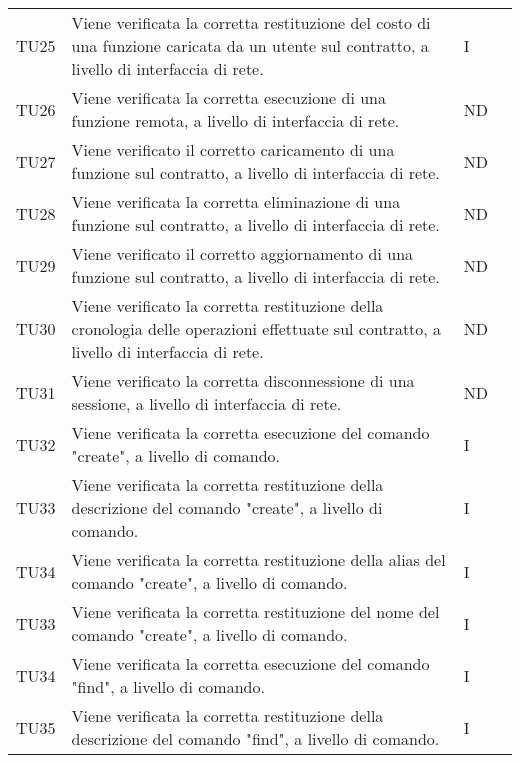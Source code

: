 \begin{longtable}{|C{1.5cm}|C{8cm}|C{3cm}|C{1cm}|}
	TU25 &
	Viene verificata la corretta restituzione del costo di una funzione caricata da un utente sul contratto, a livello di interfaccia di rete.  &
	I \\

	TU26 &
	Viene verificata la corretta esecuzione di una funzione remota, a livello di interfaccia di rete.  &
	ND \\

	TU27 &
	Viene verificato il corretto caricamento di una funzione sul contratto, a livello di interfaccia di rete.  &
	ND \\

	TU28 &
	Viene verificata la corretta eliminazione di una funzione sul contratto, a livello di interfaccia di rete.  &
	ND \\

	TU29 &
	Viene verificato il corretto aggiornamento di una funzione sul contratto, a livello di interfaccia di rete.  &
	ND \\

	TU30 &
	Viene verificato la corretta restituzione della cronologia delle operazioni effettuate sul contratto, a livello di interfaccia di rete.  &
	ND \\

	TU31 &
	Viene verificato la corretta disconnessione di una sessione, a livello di interfaccia di rete.  &
	ND \\

	TU32 &
	Viene verificata la corretta esecuzione del comando "create", a livello di comando.  &
	I \\

	TU33 &
	Viene verificata la corretta restituzione della descrizione del comando "create", a livello di comando.  &
	I \\

	TU34 &
	Viene verificata la corretta restituzione della alias del comando "create", a livello di comando.  &
	I \\

	TU33 &
	Viene verificata la corretta restituzione del nome del comando "create", a livello di comando.  &
	I \\

	TU34 &
	Viene verificata la corretta esecuzione del comando "find", a livello di comando.  &
	I \\

	TU35 &
	Viene verificata la corretta restituzione della descrizione del comando "find", a livello di comando.  &
	I \\


\end{longtable}
